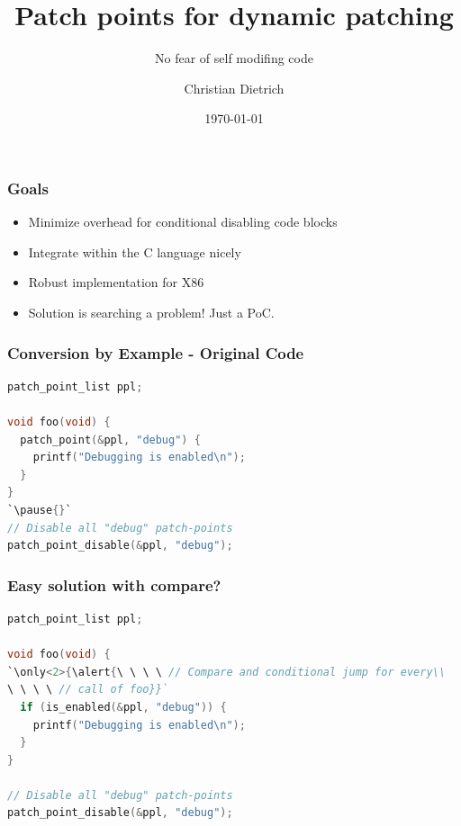 \documentclass{beamer}
\begin{document}
\title{Patch points for dynamic patching}
\subtitle{No fear of self modifing code}
\author[cd]{Christian Dietrich}
\date{\today} 

\begin{frame}[plain]
\titlepage
\end{frame}


\begin{frame}\frametitle{Goals}
  \begin{itemize}
    \item<1-> Minimize overhead for conditional disabling code blocks \bigskip{}
    \item<2-> Integrate within the C language nicely \bigskip{}
    \item<3-> Robust implementation for X86  \bigskip{}
    \item<5-> Solution is searching a problem! Just a PoC.
  \end{itemize}
\end{frame}

\begin{frame}[fragile]\frametitle{Conversion by Example - Original Code} 
  \begin{lstlisting}[language=C,escapechar=`]
patch_point_list ppl;

void foo(void) {
  patch_point(&ppl, "debug") {
    printf("Debugging is enabled\n");
  }
}
`\pause{}`
// Disable all "debug" patch-points
patch_point_disable(&ppl, "debug");
\end{lstlisting}
\end{frame}

\begin{frame}[fragile]\frametitle{Easy solution with compare?}
  \begin{lstlisting}[language=C,escapechar=`]
patch_point_list ppl;

void foo(void) {
`\only<2>{\alert{\ \ \ \ // Compare and conditional jump for every\\
\ \ \ \ // call of foo}}`
  if (is_enabled(&ppl, "debug")) {
    printf("Debugging is enabled\n");
  }
}

// Disable all "debug" patch-points
patch_point_disable(&ppl, "debug");
  \end{lstlisting}
\pause
\end{frame}
\end{document}
